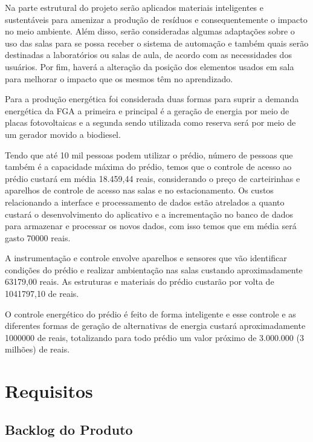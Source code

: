 Na parte estrutural do projeto serão aplicados materiais inteligentes e sustentáveis para amenizar a produção de resíduos e consequentemente o impacto no meio ambiente. Além disso, serão consideradas algumas adaptações sobre o uso das salas para se possa receber o sistema de automação e também quais serão destinadas a laboratórios ou salas de aula, de acordo com as necessidades dos usuários. Por fim, haverá a alteração da posição dos elementos usados em sala para melhorar o impacto que os mesmos têm no aprendizado.

Para a produção energética foi considerada duas formas para suprir a demanda energética da FGA a primeira e principal é a geração de energia por meio de placas fotovoltaicas e a segunda sendo utilizada como reserva será por meio de um gerador movido a biodiesel.

Tendo que até 10 mil pessoas podem utilizar o prédio, número de pessoas que também é a capacidade máxima do prédio, temos que o controle de acesso ao prédio custará em média 18.459,44 reais, considerando o preço de carteirinhas e aparelhos de controle de acesso nas salas e no estacionamento. Os custos relacionando a interface e processamento de dados estão atrelados a quanto custará o desenvolvimento do aplicativo e a incrementação no banco de dados para armazenar e processar os novos dados, com isso temos que em média será gasto 70000 reais.

A instrumentação e controle envolve aparelhos e sensores que vão identificar condições do prédio e realizar ambientação nas salas custando aproximadamente 63179,00 reais. As estruturas e materiais do prédio custarão por volta de 1041797,10 de reais.

O controle energético do prédio é feito de forma inteligente e esse controle e as diferentes formas de geração de alternativas de energia custará aproximadamente 1000000 de reais, totalizando para todo prédio um valor próximo de 3.000.000 (3 milhões) de reais.

\chapter{Requisitos\label{ch:requisitos}}
\section{Backlog do Produto}


